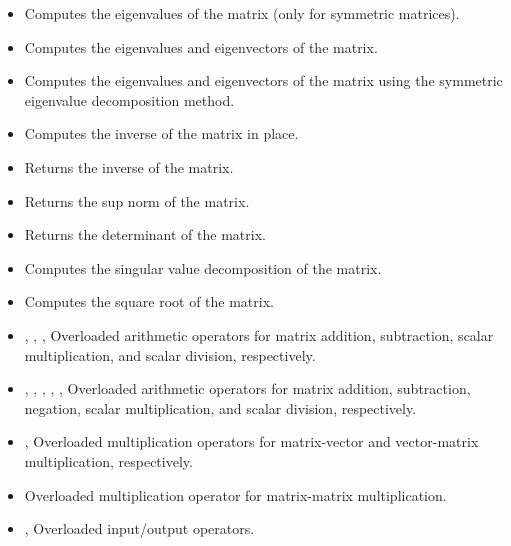 \documentclass[a4paper,onecolumn,11pt]{doofus}
\begin{document}
\begin{itemize}
\item {} Computes the eigenvalues of the matrix (only for symmetric matrices).
\item {} Computes the eigenvalues and eigenvectors of the matrix.
\item {} Computes the eigenvalues and eigenvectors of the matrix using the symmetric eigenvalue decomposition method.
\item {} Computes the inverse of the matrix in place.
\item {} Returns the inverse of the matrix.
\item {} Returns the sup norm of the matrix.
\item {} Returns the determinant of the matrix.
\item {} Computes the singular value decomposition of the matrix.
\item {} Computes the square root of the matrix.
\item {}, , ,  Overloaded arithmetic operators for matrix addition, subtraction, scalar multiplication, and scalar division, respectively.
\item {}, , , , ,  Overloaded arithmetic operators for matrix addition, subtraction, negation, scalar multiplication, and scalar division, respectively.
\item {},  Overloaded multiplication operators for matrix-vector and vector-matrix multiplication, respectively.
\item {} Overloaded multiplication operator for matrix-matrix multiplication.
\item {},  Overloaded input/output operators.
\end{itemize}
\end{document}
